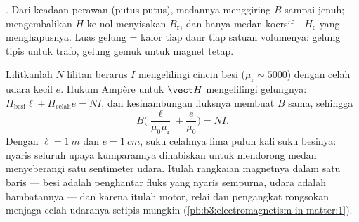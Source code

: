 \begin{omfigure}

{\small {}. Dari keadaan perawan (putus-putus),
medannya menggiring $B$ sampai jenuh; mengembalikan $H$ ke nol menyisakan
 $B_{\text{r}}$, dan hanya medan koersif
$-H_{\text{c}}$ yang menghapusnya. Luas gelung = kalor tiap daur tiap
satuan volumenya: gelung tipis untuk trafo, gelung gemuk untuk magnet
tetap.}
\end{omfigure}

\begin{example}\label{ex:b3:electromagnetism-in-matter:electromagnet}
Lilitkanlah $N$ lilitan berarus $I$ mengelilingi cincin besi ($\mu_{\text{r}}
\sim 5000$) dengan celah udara kecil $e$. Hukum Ampère untuk $\vect H$
mengelilingi gelungnya: $H_{\text{besi}}\ell + H_{\text{celah}}e = NI$, dan
kesinambungan fluksnya membuat $B$ sama, sehingga
\[
B\Big(\frac{\ell}{\mu_0\mu_{\text{r}}} + \frac{e}{\mu_0}\Big) = NI .
\]
Dengan $\ell = \qty{1}{m}$ dan $e = \qty{1}{cm}$, suku celahnya
lima puluh kali suku besinya: nyaris seluruh upaya kumparannya
dihabiskan untuk mendorong medan menyeberangi satu sentimeter udara.
Itulah rangkaian magnetnya dalam satu baris --- besi adalah penghantar
fluks yang nyaris sempurna, udara adalah hambatannya --- dan karena
itulah motor, relai dan pengangkat rongsokan menjaga celah udaranya
setipis mungkin
(\cref{pb:b3:electromagnetism-in-matter:1}).
\end{example}

